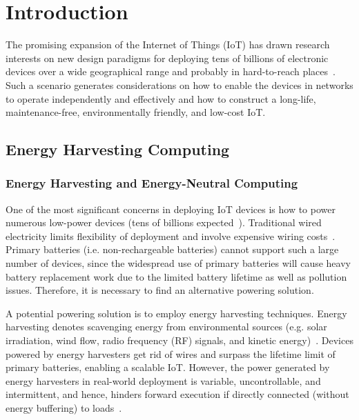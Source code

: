 \chapter{Introduction} \label{Chapter:Introduction}

The promising expansion of the Internet of Things (IoT) has drawn research interests on new design paradigms for deploying tens of billions of electronic devices over a wide geographical range and probably in hard-to-reach places~\cite{hahm2016operating, mainetti2011evolution}. Such a scenario generates considerations on how to enable the devices in networks to operate independently and effectively and how to construct a long-life, maintenance-free, environmentally friendly, and low-cost IoT.

\section{Energy Harvesting Computing}

\subsection{Energy Harvesting and Energy-Neutral Computing}

One of the most significant concerns in deploying IoT devices is how to power numerous low-power devices (tens of billions expected~\cite{hahm2016operating, adegbija2017microprocessor, shi2016edge}). Traditional wired electricity limits flexibility of deployment and involve expensive wiring costs~\cite{rabaey2000picoradio}. Primary batteries (i.e. non-rechargeable batteries) cannot support such a large number of devices, since the widespread use of primary batteries will cause heavy battery replacement work due to the limited battery lifetime as well as pollution issues. Therefore, it is necessary to find an alternative powering solution.

A potential powering solution is to employ energy harvesting techniques. Energy harvesting denotes scavenging energy from environmental sources (e.g. solar irradiation, wind flow, radio frequency (RF) signals, and kinetic energy)~\cite{mitcheson2008energy}. Devices powered by energy harvesters get rid of wires and surpass the lifetime limit of primary batteries, enabling a scalable IoT. However, the power generated by energy harvesters in real-world deployment is variable, uncontrollable, and intermittent, and hence, hinders forward execution if directly connected (without energy buffering) to loads~\cite{chalasani2008survey}.

